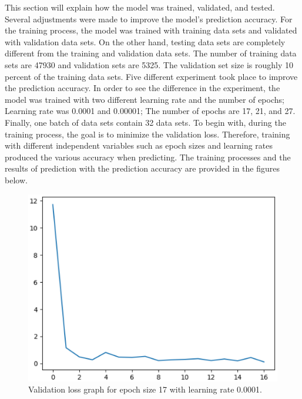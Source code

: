 This section will explain how the model was trained, validated, and tested. Several adjustments were
made to improve the model's prediction accuracy. For the training process, the model was trained with
training data sets and validated with validation data sets. On the other hand, testing data sets are
completely different from the training and validation data sets.
The number of training data sets are 47930 and validation sets are 5325. The validation set size is
roughly 10 percent of the training data sets. Five different experiment took place to improve the
prediction accuracy. In order to see the difference in the experiment, the model was trained with two
different learning rate and the number of epochs; Learning rate was 0.0001 and 0.00001; The number of
epochs are 17, 21, and 27. Finally, one batch of data sets contain 32 data sets.
\newline
\newline
\indent
To begin with, during the training process, the goal is to minimize the validation loss. Therefore,
training with different independent variables such as epoch sizes and learning rates produced the various
accuracy when predicting. The training processes and the results of prediction with the prediction accuracy are
provided in the figures below.
    \begin{figure}
        \includegraphics[width=\textwidth, scale=0.25]{4_25000.eps}
        \caption{Validation loss graph for epoch size 17 with learning rate 0.0001.} \label{Figure2}
    \end{figure}

